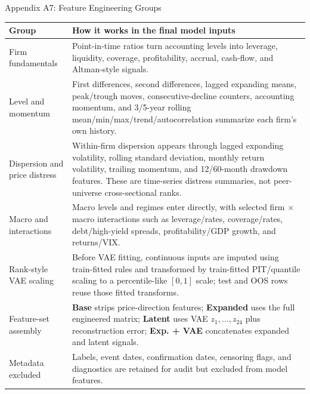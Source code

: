 \documentclass[10pt]{beamer}\usepackage[]{graphicx}\usepackage[table]{xcolor}
\begin{document}
\begin{frame}{Appendix A7: Feature Engineering Groups}
\fontsize{6.9pt}{7.55pt}\selectfont
\renewcommand{\arraystretch}{1.08}
\setlength{\tabcolsep}{3.0pt}

\begin{table}[ht]
\centering
\begin{tabular}{L{2.55cm}L{8.15cm}}
\toprule
Group & How it works in the final model inputs \\
\midrule
Firm fundamentals & Point-in-time ratios turn accounting levels into leverage, liquidity, coverage, profitability, accrual, cash-flow, and Altman-style signals. \\
Level and momentum & First differences, second differences, lagged expanding means, peak/trough moves, consecutive-decline counters, accounting momentum, and 3/5-year rolling mean/min/max/trend/autocorrelation summarize each firm's own history. \\
Dispersion and price distress & Within-firm dispersion appears through lagged expanding volatility, rolling standard deviation, monthly return volatility, trailing momentum, and 12/60-month drawdown features. These are time-series distress summaries, not peer-universe cross-sectional ranks. \\
Macro and interactions & Macro levels and regimes enter directly, with selected firm \(\times\) macro interactions such as leverage/rates, coverage/rates, debt/high-yield spreads, profitability/GDP growth, and returns/VIX. \\
Rank-style VAE scaling & Before VAE fitting, continuous inputs are imputed using train-fitted rules and transformed by train-fitted PIT/quantile scaling to a percentile-like \([0,1]\) scale; test and OOS rows reuse those fitted transforms. \\
Feature-set assembly & \textbf{Base} strips price-direction features; \textbf{Expanded} uses the full engineered matrix; \textbf{Latent} uses VAE \(z_1,\ldots,z_{24}\) plus reconstruction error; \textbf{Exp. + VAE} concatenates expanded and latent signals. \\
Metadata excluded & Labels, event dates, confirmation dates, censoring flags, and diagnostics are retained for audit but excluded from model features. \\
\bottomrule
\end{tabular}
\end{table}
\end{frame}
\end{document}
